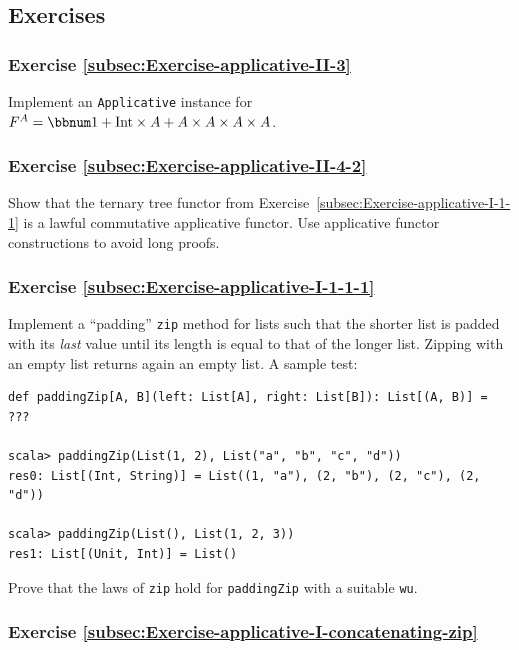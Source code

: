 \subsection{Exercises}

\subsubsection{Exercise \label{subsec:Exercise-applicative-II-3}\ref{subsec:Exercise-applicative-II-3}}

Implement an \lstinline!Applicative! instance for $F^{A}=\bbnum 1+\text{Int}\times A+A\times A\times A\times A$.

\subsubsection{Exercise \label{subsec:Exercise-applicative-II-4-2}\ref{subsec:Exercise-applicative-II-4-2}}

Show that the ternary tree functor from Exercise~\ref{subsec:Exercise-applicative-I-1-1}
is a lawful commutative applicative functor. Use applicative functor
constructions to avoid long proofs.

\subsubsection{Exercise \label{subsec:Exercise-applicative-I-1-1-1}\ref{subsec:Exercise-applicative-I-1-1-1}}

Implement a \textsf{``}padding\textsf{''} \lstinline!zip! method
for lists such that the shorter list is padded with its \emph{last}
value until its length is equal to that of the longer list. Zipping
with an empty list returns again an empty list. A sample test:
\begin{lstlisting}
def paddingZip[A, B](left: List[A], right: List[B]): List[(A, B)] = ???

scala> paddingZip(List(1, 2), List("a", "b", "c", "d"))
res0: List[(Int, String)] = List((1, "a"), (2, "b"), (2, "c"), (2, "d"))

scala> paddingZip(List(), List(1, 2, 3))
res1: List[(Unit, Int)] = List()
\end{lstlisting}
Prove that the laws of \lstinline!zip! hold for \lstinline!paddingZip!
with a suitable \lstinline!wu!.

\subsubsection{Exercise \label{subsec:Exercise-applicative-I-concatenating-zip}\ref{subsec:Exercise-applicative-I-concatenating-zip}}

